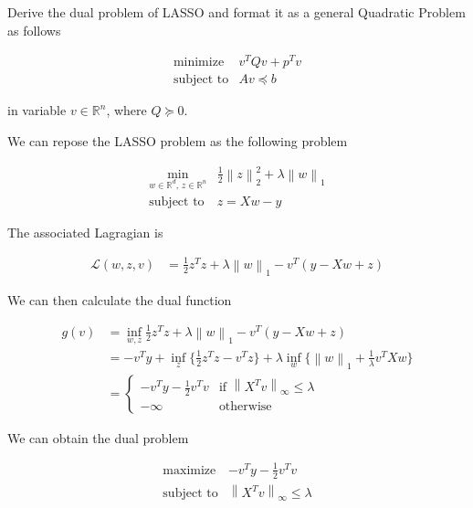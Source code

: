 \documentclass[11pt]{article}
\begin{document}
    Derive the dual problem of LASSO and format it as a general Quadratic
Problem as follows

\begin{equation}
\tag{QP}
\begin{array}{ll}
\text{minimize} & v^TQv + p^Tv \\
\text{subject to} & Av \preceq b
\end{array}
\end{equation}

in variable \(v\in \mathbb{R}^n\), where \(Q \succeq 0\).

    We can repose the LASSO problem as the following problem

\begin{equation}
\tag{LASSO'}
\begin{array}{ll}
\displaystyle \min_{w \in \mathbb{R}^d,\, z \in \mathbb{R}^n} & \frac{1}{2} \left\lVert z \right\rVert^2_2 + \lambda \left\lVert w \right\rVert_1 \\
\text{subject to} & z = Xw - y 
\end{array}
\end{equation}

The associated Lagragian is

\begin{align*}
\mathcal{L}(w, z, v) &= \frac{1}{2} z^T z + \lambda \left\lVert w \right\rVert_1 - v^T (y-Xw+z)
\end{align*}

We can then calculate the dual function

\begin{align*}
g(v) &= \inf_{w, z} \frac{1}{2} z^T z + \lambda \left\lVert w \right\rVert_1 - v^T (y-Xw+z) \\
&= - v^T y + \inf_z \{ \frac{1}{2} z^T z - v^T z\} + \lambda \inf_w \{\left\lVert w \right\rVert_1 + \frac{1}{\lambda} v^T X w\} \\
&= \left\{ \begin{array}{ll} - v^T y - \frac{1}{2} v^T v & \text{if } \left\lVert X^T v \right\lVert_{\infty} \le \lambda \\
- \infty & \text{otherwise} \end{array}\right.
\end{align*}

We can obtain the dual problem

\begin{equation}
\tag{LASSO*}
\begin{array}{ll}
\text{maximize} & - v^T y - \frac{1}{2} v^T v \\
\text{subject to} & \left\lVert X^T v \right\lVert_{\infty} \le \lambda \\
\end{array}
\end{equation}
\end{document}

